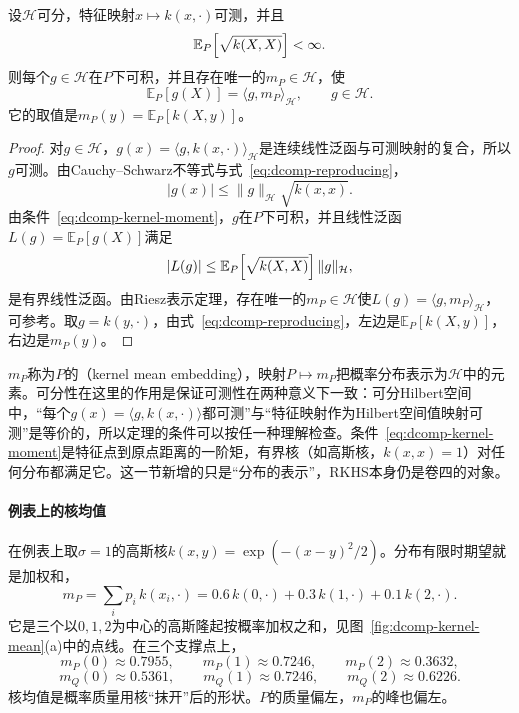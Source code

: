 \begin{theorem}[核均值]
\label{thm:dcomp-kernel-mean}
设$\mathcal{H}$可分，特征映射$x\mapsto k(x,\cdot)$可测，并且
\begin{equation}
 \mathbb{E}_{P}\Bigl[\sqrt{k(X,X)}\Bigr]<\infty .
 \label{eq:dcomp-kernel-moment}
\end{equation}
则每个$g\in\mathcal{H}$在$P$下可积，并且存在唯一的$m_P\in\mathcal{H}$，使
\begin{equation}
 \mathbb{E}_{P}[g(X)]=\langle g,m_P\rangle_{\mathcal{H}},\qquad g\in\mathcal{H} .
 \label{eq:dcomp-kernel-mean}
\end{equation}
它的取值是$m_P(y)=\mathbb{E}_{P}[k(X,y)]$。
\end{theorem}

\begin{proof}
对$g\in\mathcal{H}$，$g(x)=\langle g,k(x,\cdot)\rangle_{\mathcal{H}}$是连续线性泛函与可测映射的复合，所以$g$可测。由Cauchy--Schwarz不等式与式~\eqref{eq:dcomp-reproducing}，
\[
 \lvert g(x)\rvert\leq\lVert g\rVert_{\mathcal{H}}\sqrt{k(x,x)} .
\]
由条件~\eqref{eq:dcomp-kernel-moment}，$g$在$P$下可积，并且线性泛函$L(g)=\mathbb{E}_{P}[g(X)]$满足
\[
 \lvert L(g)\rvert\leq\mathbb{E}_{P}\Bigl[\sqrt{k(X,X)}\Bigr]\,\lVert g\rVert_{\mathcal{H}},
\]
是有界线性泛函。由Riesz表示定理，存在唯一的$m_P\in\mathcal{H}$使$L(g)=\langle g,m_P\rangle_{\mathcal{H}}$，可参考。取$g=k(y,\cdot)$，由式~\eqref{eq:dcomp-reproducing}，左边是$\mathbb{E}_{P}[k(X,y)]$，右边是$m_P(y)$。
\end{proof}

$m_P$称为$P$的（kernel mean embedding），映射$P\mapsto m_P$把概率分布表示为$\mathcal{H}$中的元素。可分性在这里的作用是保证可测性在两种意义下一致：可分Hilbert空间中，“每个$g(x)=\langle g,k(x,\cdot)\rangle$都可测”与“特征映射作为Hilbert空间值映射可测”是等价的，所以定理的条件可以按任一种理解检查。条件~\eqref{eq:dcomp-kernel-moment}是特征点到原点距离的一阶矩，有界核（如高斯核，$k(x,x)=1$）对任何分布都满足它。这一节新增的只是“分布的表示”，RKHS本身仍是卷四的对象。

\paragraph{例表上的核均值}
在例表上取$\sigma=1$的高斯核$k(x,y)=\exp(-(x-y)^{2}/2)$。分布有限时期望就是加权和，
\[
 m_P=\sum_{i}p_i\,k(x_i,\cdot)=0.6\,k(0,\cdot)+0.3\,k(1,\cdot)+0.1\,k(2,\cdot) .
\]
它是三个以$0,1,2$为中心的高斯隆起按概率加权之和，见图~\ref{fig:dcomp-kernel-mean}(a)中的点线。在三个支撑点上，
\[
 m_P(0)\approx0.7955,\qquad m_P(1)\approx0.7246,\qquad m_P(2)\approx0.3632,
\]
\[
 m_Q(0)\approx0.5361,\qquad m_Q(1)\approx0.7246,\qquad m_Q(2)\approx0.6226 .
\]
核均值是概率质量用核“抹开”后的形状。$P$的质量偏左，$m_P$的峰也偏左。

